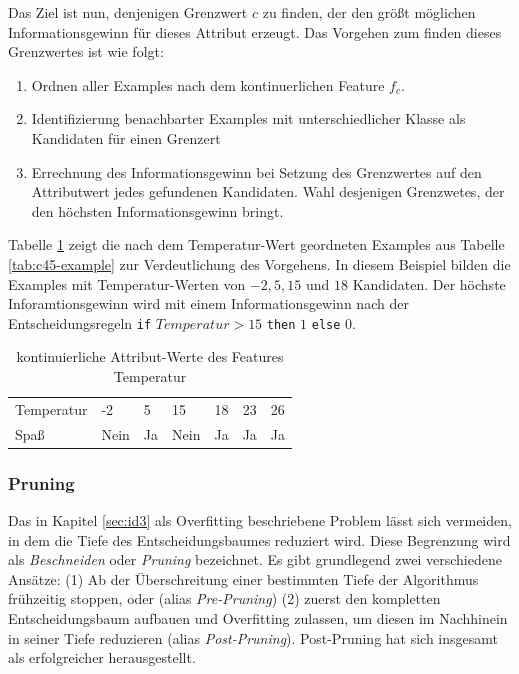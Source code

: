 Das Ziel ist nun, denjenigen Grenzwert $c$ zu finden, der den größt möglichen Informationsgewinn für dieses Attribut erzeugt. Das Vorgehen zum finden dieses Grenzwertes ist wie folgt:
\begin{enumerate}
\item Ordnen aller Examples nach dem kontinuerlichen Feature $f_c$. 
\item Identifizierung benachbarter Examples mit unterschiedlicher Klasse als Kandidaten für einen Grenzert
\item Errechnung des Informationsgewinn bei Setzung des Grenzwertes auf den Attributwert jedes gefundenen Kandidaten. Wahl desjenigen Grenzwetes, der den höchsten Informationsgewinn bringt. \cite[S. 73]{machine_mitchell}
\end{enumerate}

Tabelle \ref{tab:c45-example-ordered} zeigt die nach dem Temperatur-Wert geordneten Examples aus Tabelle \ref{tab:c45-example} zur Verdeutlichung des Vorgehens. In diesem Beispiel bilden die Examples mit Temperatur-Werten von $-2, 5, 15$ und $18$ Kandidaten. Der höchste Inforamtionsgewinn wird mit einem Informationsgewinn nach der Entscheidungsregeln \texttt{if} $Temperatur > 15$ \texttt{then} $1$ \texttt{else} $0$.

\begin{table}[h]
	\centering
	\caption{kontinuierliche Attribut-Werte des Features \glqq Temperatur\grqq }
	\label{tab:c45-example-ordered}
	\begin{tabular}{lllllll}
		\toprule
		Temperatur & -2   & 5   & 15     & 18    & 23 & 26  \\
		Spaß            & Nein& Ja  & Nein & Ja & Ja   &Ja \\ \bottomrule
	\end{tabular}
\end{table}

\subsubsection*{Pruning}

Das in Kapitel \ref{sec:id3} als Overfitting beschriebene Problem lässt sich vermeiden, in dem die Tiefe des Entscheidungsbaumes reduziert wird. Diese Begrenzung wird als \emph{Beschneiden} oder \emph{Pruning} bezeichnet. Es gibt grundlegend zwei verschiedene Ansätze: (1) Ab der Überschreitung einer bestimmten Tiefe der Algorithmus frühzeitig stoppen, oder (alias \emph{Pre-Pruning}) (2) zuerst den kompletten Entscheidungsbaum aufbauen und Overfitting zulassen, um diesen im Nachhinein in seiner Tiefe reduzieren (alias \emph{Post-Pruning}). Post-Pruning hat sich insgesamt als erfolgreicher herausgestellt. \cite[S. 68 - 69]{machine_mitchell} 

